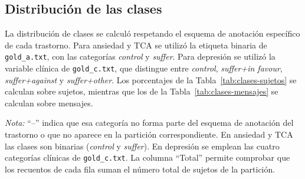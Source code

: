 \subsection{Distribución de las clases}
\label{sec:distribucion-clases}

La distribución de clases se calculó respetando el esquema de anotación
específico de cada trastorno. Para ansiedad y TCA se utilizó la etiqueta
binaria de \texttt{gold\_a.txt}, con las categorías \textit{control} y
\textit{suffer}. Para depresión se utilizó la variable clínica de
\texttt{gold\_c.txt}, que distingue entre \textit{control},
\textit{suffer+in favour}, \textit{suffer+against} y
\textit{suffer+other}. Los porcentajes de la Tabla~\ref{tab:clases-sujetos}
se calculan sobre sujetos, mientras que los de la
Tabla~\ref{tab:clases-mensajes} se calculan sobre mensajes.

\begin{table}[H]
    \centering
    \caption{Distribución de clases por sujeto y partición. Los valores se
    expresan como número de sujetos y porcentaje dentro de cada combinación
    de trastorno y partición.}
    \label{tab:clases-sujetos}
\end{table}

\noindent
\footnotesize
\textit{Nota:} ``--'' indica que esa categoría no forma parte del esquema de
anotación del trastorno o que no aparece en la partición correspondiente. En
ansiedad y TCA las clases son binarias (\textit{control} y \textit{suffer}).
En depresión se emplean las cuatro categorías clínicas de
\texttt{gold\_c.txt}. La columna ``Total'' permite comprobar que los
recuentos de cada fila suman el número total de sujetos de la partición.
\normalsize

